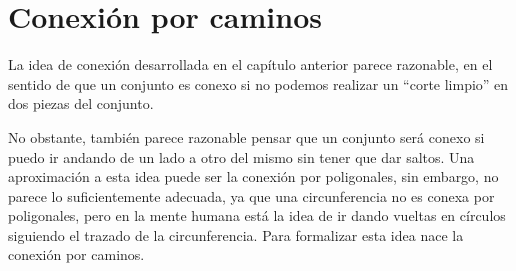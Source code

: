 \chapter{Conexión por caminos}
\label{cam}
La idea de conexión desarrollada en el capítulo anterior parece razonable, en el sentido de que un conjunto es conexo si no podemos realizar un ``corte limpio'' en dos piezas del conjunto.

No obstante, también parece razonable pensar que un conjunto será conexo si puedo ir andando de un lado a otro del mismo sin tener que dar saltos. Una aproximación a esta idea puede ser la conexión por poligonales, sin embargo, no parece lo suficientemente adecuada, ya que una circunferencia no es conexa por poligonales, pero en la mente humana está la idea de ir dando vueltas en círculos siguiendo el trazado de la circunferencia. Para formalizar esta idea nace la conexión por caminos.
